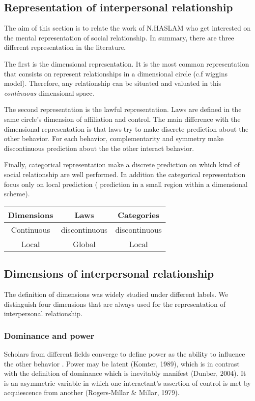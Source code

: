 \documentclass{llncs}
\begin{document}
\subsection{Representation of interpersonal relationship}

The aim of this section is to relate the work of N.HASLAM who get interested on the mental representation of social relationship. In summary, there are three different representation in the literature. 
\par The first is the dimensional representation. It is the most common representation that consists on represent relationships in a dimensional circle (c.f wiggins model). Therefore, any relationship can be situated and valuated  in this  \textit{continuous} dimensional space. 

The second representation is the lawful representation. Laws are defined in the same circle's dimension of affiliation and control. The main difference with the dimensional representation is that laws try to make discrete prediction about the other behavior. For each behavior, complementarity and symmetry make discontinuous prediction about the the other interact behavior. 

Finally, categorical representation  make a discrete prediction on which kind of social relationship are well performed. In addition the categorical representation focus only on local prediction ( prediction in a small region within a dimensional scheme).

\begin{tabular}{|c|c|c|}
  \hline
  Dimensions & Laws & Categories \\
  \hline
  	Continuous &   discontinuous   &   discontinuous  \\
 	Local & Global & Local\\
  \hline
\end{tabular}

\subsection{Dimensions of interpersonal relationship}
The definition of dimensions was widely studied under different labels. We distinguish four dimensions that are always used for the representation of interpersonal relationship. 
\subsubsection{Dominance and power}
Scholars from different fields converge to define power as the ability to influence the other behavior \cite{svennevig2000getting}. Power may be latent (Komter, 1989), which is in contrast with the definition of dominance which is inevitably manifest (Dunber, 2004). It is an asymmetric variable in which one interactant's assertion of control is met by acquiescence from another (Rogers-Millar \& Millar, 1979). 
\end{document}
